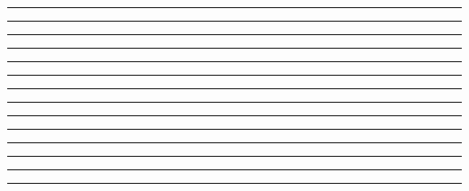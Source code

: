 \documentclass{article}
\begin{document}
\newpage
\noindent{}\rule{1cm}{0.025cm}\framebox{\rule{1cm}{1cm}}

\newpage
\noindent{}\rule{1cm}{0.025cm}

\newpage
\noindent{}\rule{1cm}{0.025cm}

\newpage
\noindent{}\rule{1cm}{0.025cm}

\newpage
\noindent{}\rule{1cm}{0.025cm}

\newpage
\noindent{}\rule{1cm}{0.025cm}

\newpage
\noindent{}\rule{1cm}{0.025cm}

\newpage
\noindent{}\rule{1cm}{0.025cm}

\newpage
\noindent{}\rule{1cm}{0.025cm}

\newpage
\noindent{}\rule{1cm}{0.025cm}

\newpage
\noindent{}\rule{1cm}{0.025cm}

\newpage
\noindent{}\rule{1cm}{0.025cm}

\newpage
\noindent{}\rule{1cm}{0.025cm}

\newpage
\noindent{}\rule{1cm}{0.025cm}
\end{document}
